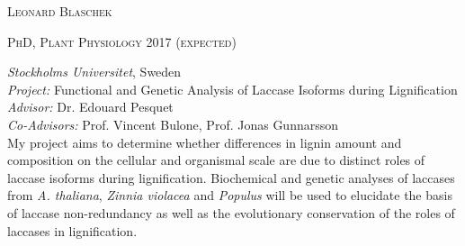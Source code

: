 \documentclass[11pt]{article}
\begin{document}
	\setlength\parindent{15pt}
\begin{center}
	\huge{\textsc{Leonard Blaschek}}
	\vspace*{0.3cm}
\end{center}

\vspace{0.1cm}

\textsc{\large{PhD, Plant Physiology} \hfill \textsc{2017 \textnormal{(expected)}}}
\begin{addmargin}[24pt]{0pt}
	\textit{Stockholms Universitet}, Sweden \\
	\textit{Project:} Functional and Genetic Analysis of Laccase Isoforms during Lignification \\
	\textit{Advisor:} Dr. Edouard Pesquet \\
	\textit{Co-Advisors:} Prof. Vincent Bulone, Prof. Jonas Gunnarsson
	\vspace{0.1cm} \\
	\small{My project aims to determine whether differences in lignin amount and composition on the cellular and organismal scale are due to distinct roles of laccase isoforms during lignification. Biochemical and genetic analyses of laccases from \textit{A. thaliana}, \textit{Zinnia violacea} and \textit{Populus} will be used to elucidate the basis of laccase non-redundancy as well as the evolutionary conservation of the roles of laccases in lignification.}
\end{addmargin}
\vspace{0.2cm}
\end{document}
